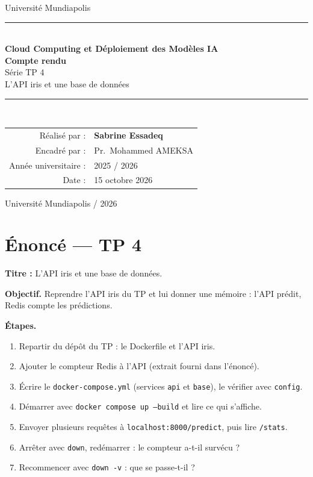 \documentclass[11pt,a4paper]{article}
\begin{document}
\thispagestyle{empty}
\vspace*{1.6cm}
\begin{center}
  {\large Université Mundiapolis}\\[1.4cm]
  \textcolor{rouge}{\rule{0.72\textwidth}{1.1pt}}\\[0.7cm]
  {\Large\bfseries Cloud Computing et Déploiement des Modèles IA}\\[0.55cm]
  {\LARGE\bfseries\color{rouge} Compte rendu}\\[0.35cm]
  {\large Série TP 4}\\[0.25cm]
  {\large L'API iris et une base de données}\\[0.7cm]
  \textcolor{rouge}{\rule{0.72\textwidth}{1.1pt}}\\[1.6cm]
  \begin{tabular}{rl}
    Réalisé par : & \textbf{Sabrine Essadeq} \\[0.45em]
    Encadré par : & Pr.\ Mohammed AMEKSA \\[0.45em]
    Année universitaire : & 2025 / 2026 \\[0.45em]
    Date : & 15 octobre 2026 \\
  \end{tabular}
\end{center}
\vfill
\begin{center}
  {\small Université Mundiapolis \quad\textperiodcentered{} / 2026}
\end{center}
\clearpage
\setcounter{page}{1}

\section*{Énoncé --- TP 4}

\textbf{Titre :} L'API iris et une base de données.

\textbf{Objectif.} Reprendre l'API iris du TP et lui donner une mémoire : l'API prédit, Redis compte les prédictions.

\textbf{Étapes.}
\begin{enumerate}[leftmargin=1.4em]
  \item Repartir du dépôt du TP : le Dockerfile et l'API iris.
  \item Ajouter le compteur Redis à l'API (extrait fourni dans l'énoncé).
  \item Écrire le \texttt{docker-compose.yml} (services \texttt{api} et \texttt{base}), le vérifier avec \texttt{config}.
  \item Démarrer avec \texttt{docker compose up --build} et lire ce qui s'affiche.
  \item Envoyer plusieurs requêtes à \texttt{localhost:8000/predict}, puis lire \texttt{/stats}.
  \item Arrêter avec \texttt{down}, redémarrer : le compteur a-t-il survécu ?
  \item Recommencer avec \texttt{down -v} : que se passe-t-il ?
\end{enumerate}
\end{document}
